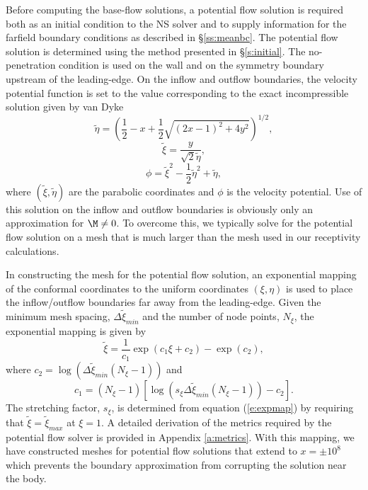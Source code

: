 Before computing the base-flow solutions, a potential flow solution is
required both as an initial condition to the NS solver and to supply
information for the farfield boundary conditions as described in
\S\ref{ss:meanbc}. The potential flow solution is determined using the method
presented in \S\ref{s:initial}.  The no-penetration condition is used on the
wall and on the symmetry boundary upstream of the leading-edge.  On the inflow
and outflow boundaries, the velocity potential function is set to the value
corresponding to the exact incompressible solution given by van Dyke
\cite{vanDyke:64}
%
\begin{equation}
\tilde\eta = \left( \frac{1}{2} - x + \frac{1}{2} 
                    \sqrt{(2x-1)^2 + 4 y^2} \right)^{1/2},
\end{equation}
\begin{equation}
\tilde\xi  = \frac{y}{\sqrt{2} \tilde\eta} ,
\end{equation}
\begin{equation}
\phi = \tilde\xi^2 - \frac{1}{2} \tilde\eta^2 + \tilde\eta ,
\end{equation} 
%
where $(\tilde\xi,\tilde\eta)$ are the parabolic coordinates and $\phi$ is the
velocity potential.  Use of this solution on the inflow and outflow boundaries
is obviously only an approximation for $\M \ne 0$.  To overcome this, we
typically solve for the potential flow solution on a mesh that is much larger
than the mesh used in our receptivity calculations.

In constructing the mesh for the potential flow solution, an exponential
mapping of the conformal coordinates to the uniform coordinates $(\xi,\eta)$
is used to place the inflow/outflow boundaries far away from the leading-edge.
Given the minimum mesh spacing, $\Delta\tilde\xi_{min}$ and the number of node
points, $N_\xi$, the exponential mapping is given by
%
\begin{equation} \label{e:expmap}
  \tilde\xi = \frac{1}{c_1} \exp\left( c_1 \xi + c_2 \right) - 
              \exp\left( c_2 \right) ,
\end{equation}
%
where $c_2 = \log\left( \Delta\tilde\xi_{min} (N_\xi - 1) \right)$ and 
%
\begin{equation}
  c_1 = (N_\xi - 1) \left[ \log\left( s_\xi \Delta\tilde\xi_{min} 
                                      (N_\xi-1) \right) - c_2 \right] .
\end{equation}
%
The stretching factor, $s_\xi$, is determined from equation (\ref{e:expmap})
by requiring that $\tilde\xi = \tilde\xi_{max}$ at $\xi=1$.  A detailed
derivation of the metrics required by the potential flow solver is provided in
Appendix \ref{a:metrics}.  With this mapping, we have constructed meshes for
potential flow solutions that extend to $x = \pm 10^8$ which prevents the
boundary approximation from corrupting the solution near the body.

